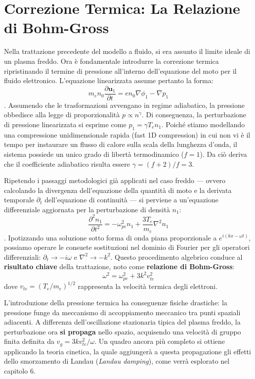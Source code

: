\section{Correzione Termica: La Relazione di Bohm-Gross}

Nella trattazione precedente del modello a fluido, si era assunto il limite ideale di un plasma freddo. Ora è fondamentale introdurre la correzione termica ripristinando il termine di pressione all'interno dell'equazione del moto per il fluido elettronico. L'equazione linearizzata assume pertanto la forma:
\begin{equation}
m_e n_0 \frac{\partial \mathbf{u}_1}{\partial t} = e n_0 \nabla\phi_1 - \nabla p_1
\end{equation}
. Assumendo che le trasformazioni avvengano in regime adiabatico, la pressione obbedisce alla legge di proporzionalità $p \propto n^\gamma$. Di conseguenza, la perturbazione di pressione linearizzata si esprime come $p_1 = \gamma T_e n_1$. Poiché stiamo modellando una compressione unidimensionale rapida (fast 1D compression) in cui non vi è il tempo per instaurare un flusso di calore sulla scala della lunghezza d'onda, il sistema possiede un unico grado di libertà termodinamico ($f = 1$). Da ciò deriva che il coefficiente adiabatico risulta essere $\gamma = (f+2)/f = 3$.

Ripetendo i passaggi metodologici già applicati nel caso freddo — ovvero calcolando la divergenza dell'equazione della quantità di moto e la derivata temporale $\partial_t$ dell'equazione di continuità — si perviene a un'equazione differenziale aggiornata per la perturbazione di densità $n_1$:
\begin{equation}
\frac{\partial^2 n_1}{\partial t^2} = -\omega_{pe}^2 n_1 + \frac{3 T_e}{m_e} \nabla^2 n_1
\end{equation}
. Ipotizzando una soluzione sotto forma di onda piana proporzionale a $e^{i(kx - \omega t)}$, possiamo operare le consuete sostituzioni nel dominio di Fourier per gli operatori differenziali: $\partial_t \to -i\omega$ e $\nabla^2 \to -k^2$. Questo procedimento algebrico conduce al \textbf{risultato chiave} della trattazione, noto come \textbf{relazione di Bohm-Gross}:
\begin{equation}
\omega^2 = \omega_{pe}^2 + 3 k^2 v_{te}^2
\end{equation}
dove $v_{te} = (T_e / m_e)^{1/2}$ rappresenta la velocità termica degli elettroni.

L'introduzione della pressione termica ha conseguenze fisiche drastiche: la pressione funge da meccanismo di accoppiamento meccanico tra punti spaziali adiacenti. A differenza dell'oscillazione stazionaria tipica del plasma freddo, la perturbazione ora \textbf{si propaga} nello spazio, acquisendo una velocità di gruppo finita definita da $v_g = 3 k v_{te}^2 / \omega$. Un quadro ancora più completo si ottiene applicando la teoria cinetica, la quale aggiungerà a questa propagazione gli effetti dello smorzamento di Landau (\textit{Landau damping}), come verrà esplorato nel capitolo 6.


